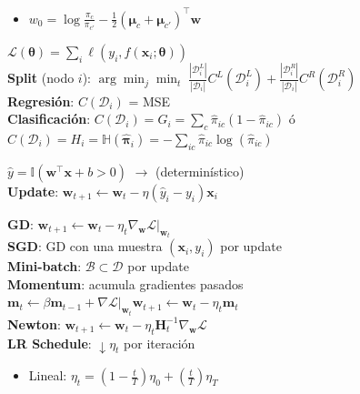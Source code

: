 \documentclass[11pt, a4paper]{article}
\newcommand{\w}{\mathbf{w}}
\newcommand{\x}{\mathbf{x}}
\newcommand{\Loss}{\mathcal{L}}
\begin{document}
\begin{minipage}[t]{0.325\textwidth}
\begin{tcolorbox}[formulabox=GDA, colframe=softRed]
\begin{itemize}
            \item $w_0 = \log\tfrac{\pi_c}{\pi_{c'}} - \tfrac{1}{2}(\boldsymbol{\mu}_c+\boldsymbol{\mu}_{c'})^\top\w$
        \end{itemize}
    \end{tcolorbox}
    \begin{tcolorbox}[formulabox=CART, colframe=softRed]
        $\Loss(\boldsymbol{\theta})= \sum_i \ell(y_i, f(\x_i;\boldsymbol{\theta}))$\\
        \textbf{Split} (nodo $i$): 
        $\arg \min_j \min_t \; \frac{|\mathcal{D}_i^L|}{|\mathcal{D}_i|}C^L(\mathcal{D}_i^L)+\frac{|\mathcal{D}_i^R|}{|\mathcal{D}_i|}C^R(\mathcal{D}_i^R)$ \\
        \textbf{Regresión}: $C(\mathcal{D}_i)$ = MSE \\
        \textbf{Clasificación}: $C(\mathcal{D}_i) = G_i = \sum_c \hat{\pi}_{ic}(1-\hat{\pi}_{ic})$ ó $C(\mathcal{D}_i) = H_i = \mathbb{H}(\hat{\boldsymbol{\pi}}_i)=-\sum_{ic} \hat{\pi}_{ic} \log(\hat{\pi}_{ic})$
    \end{tcolorbox}
    \begin{tcolorbox}[formulabox=Perceptron, colframe=softRed]
        $\hat{y} = \mathbb{I}(\w^\top\x + b > 0)$ $\to$ (determinístico) \\
        \textbf{Update}: $\w_{t+1} \leftarrow \w_t - \eta(\hat{y}_i-y_i)\mathbf{x}_i$ \\
    \end{tcolorbox}
    \begin{tcolorbox}[formulabox=Optimization, colframe=softBrown]
        \textbf{GD}: $\w_{t+1} \leftarrow \w_t - \eta_t\nabla_\w\mathcal{L}|_{\w_t}$\\
        \textbf{SGD}: GD con una muestra $(\x_i, y_i)$ por update\\
        \textbf{Mini-batch}: $\mathcal{B}\subset\mathcal{D}$ por update\\
        \textbf{Momentum}: acumula gradientes pasados\\
        $\mathbf{m}_t \leftarrow \beta \mathbf{m}_{t-1} + \nabla\mathcal{L}|_{\w_t}$\quad $\w_{t+1} \leftarrow \w_t - \eta_t \mathbf{m}_t$\\
        \textbf{Newton}: $\w_{t+1} \leftarrow \w_t - \eta_t\mathbf{H}_t^{-1}\nabla_\w\mathcal{L}$\\
        \textbf{LR Schedule}: $\downarrow \eta_t$ por iteración
        \begin{itemize}
            \item Lineal: $\eta_t = (1-\frac{t}{T})\eta_0 + (\frac{t}{T}) \eta_T$

\end{itemize}
\end{tcolorbox}
\end{minipage}
\end{document}
